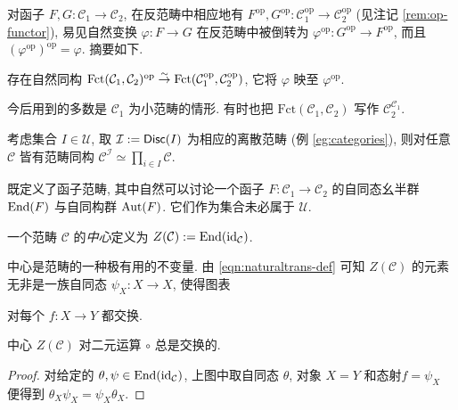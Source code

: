 对函子 $F, G : \mathcal{C}_1 \to \mathcal{C}_2$, 在反范畴中相应地有 $F^\text{op}, G^\text{op}: \mathcal{C}_1^\text{op} \to \mathcal{C}_2^\text{op}$ (见注记 \ref{rem:op-functor}), 易见自然变换 $\varphi: F \to G$ 在反范畴中被倒转为 $\varphi^\text{op}: G^\text{op} \to F^\text{op}$, 而且 $(\varphi^{\text{op}})^{\text{op}} = \varphi$.  摘要如下.

\begin{proposition}\label{prop:op-functor-cat}
	存在自然同构 $\text{Fct}(\mathcal{C}_1, \mathcal{C}_2)^\text{op} \stackrel{\sim}{\rightarrow} \text{Fct}(\mathcal{C}_1^{\text{op}}, \mathcal{C}_2^{\text{op}})$, 它将 $\varphi$ 映至 $\varphi^\text{op}$. 
\end{proposition}

今后用到的多数是 $\mathcal{C}_1$ 为小范畴的情形. 有时也把 $\text{Fct}(\mathcal{C}_1, \mathcal{C}_2)$ 写作 $\mathcal{C}_2^{\mathcal{C}_1}$.
\begin{example}
	考虑集合 $I \in \mathcal{U}$, 取 $\mathcal{I} := \mathsf{Disc}(I)$ 为相应的离散范畴 (例 \ref{eg:categories}), 则对任意 $\mathcal{C}$ 皆有范畴同构 $\mathcal{C}^{\mathcal{I}} \simeq \prod_{i \in I} \mathcal{C}$.
\end{example}

既定义了函子范畴, 其中自然可以讨论一个函子 $F: \mathcal{C}_1 \to \mathcal{C}_2$ 的自同态幺半群 $\operatorname{End}(F)$ 与自同构群 $\operatorname{Aut}(F)$. 它们作为集合未必属于 $\mathcal{U}$.
\begin{definition}\label{def:cat-center}
	一个范畴 $\mathcal{C}$ 的\emph{中心}定义为 $Z(\mathcal{C}) := \operatorname{End}(\mathrm{id}_{\mathcal{C}})$.
\end{definition}

中心是范畴的一种极有用的不变量. 由 \eqref{eqn:naturaltrans-def} 可知 $Z(\mathcal{C})$ 的元素无非是一族自同态 $\psi_X: X \to X$, 使得图表
对每个 $f: X \to Y$ 都交换.

\begin{proposition}
	中心 $Z(\mathcal{C})$ 对二元运算 $\circ$ 总是交换的.
\end{proposition}
\begin{proof}
	对给定的 $\theta, \psi \in \operatorname{End}(\mathrm{id}_{\mathcal{C}})$, 上图中取自同态 $\theta$, 对象 $X=Y$ 和态射$f = \psi_X$ 便得到 $\theta_X \psi_X = \psi_X \theta_X$.
\end{proof}

